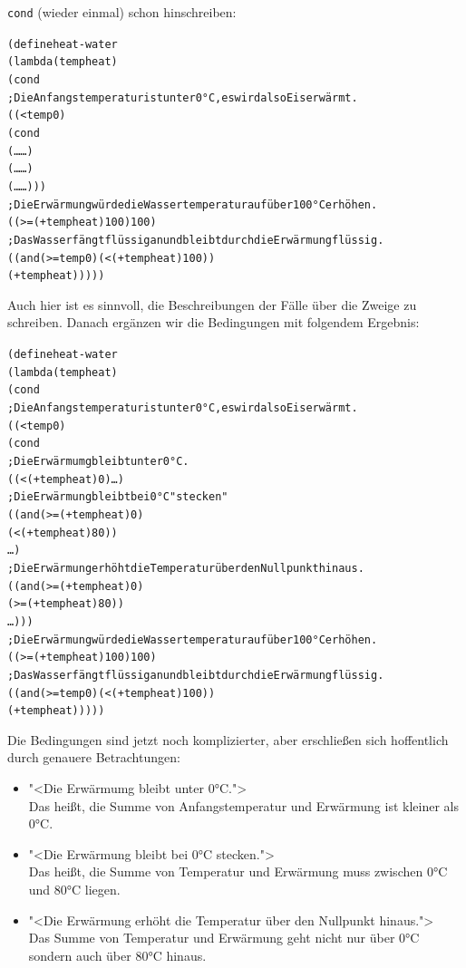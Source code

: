 \texttt{cond} (wieder einmal) schon hinschreiben:
%
\begin{alltt}
(define heat-water
  (lambda (temp heat)
    (cond
      ; Die Anfangstemperatur ist unter 0°C, es wird also Eis erwärmt.
      ((< temp 0)
       (cond
         (\ldots{} \ldots)
         (\ldots{} \ldots)
         (\ldots{} \ldots)))
      ; Die Erwärmung würde die Wassertemperatur auf über 100°C erhöhen.
      ((>= (+ temp heat) 100) 100)
      ; Das Wasser fängt flüssig an und bleibt durch die Erwärmung flüssig.
      ((and (>= temp 0) (< (+ temp heat) 100))
       (+ temp heat)))))
\end{alltt}
%
Auch hier ist es sinnvoll, die Beschreibungen der Fälle über die
Zweige zu schreiben.  Danach ergänzen wir die Bedingungen mit
folgendem Ergebnis:
%
\begin{alltt}
(define heat-water
  (lambda (temp heat)
    (cond
      ; Die Anfangstemperatur ist unter 0°C, es wird also Eis erwärmt.
      ((< temp 0)
       (cond
         ; Die Erwärmumg bleibt unter 0°C.
         ((< (+ temp heat) 0) \ldots)
         ; Die Erwärmung bleibt bei  0°C "stecken"
         ((and (>= (+ temp heat) 0)
               (< (+ temp heat) 80))
          \ldots)
         ; Die Erwärmung erhöht die Temperatur über den Nullpunkt hinaus.
         ((and (>= (+ temp heat) 0)
               (>= (+ temp heat) 80))
          \ldots)))
      ; Die Erwärmung würde die Wassertemperatur auf über 100°C erhöhen.
      ((>= (+ temp heat) 100) 100)
      ; Das Wasser fängt flüssig an und bleibt durch die Erwärmung flüssig.
      ((and (>= temp 0) (< (+ temp heat) 100))
       (+ temp heat)))))
\end{alltt}
%
Die Bedingungen sind jetzt noch komplizierter, aber erschließen sich
hoffentlich durch genauere Betrachtungen:
%
\begin{itemize}
\item "<Die Erwärmumg bleibt unter 0°C.">\\
  Das heißt, die Summe von
  Anfangstemperatur und Erwärmung ist kleiner als 0°C.
\item "<Die Erwärmung bleibt bei  0°C stecken.">\\
  Das heißt, die Summe von Temperatur und Erwärmung muss zwischen 0°C
  und 80°C liegen.
\item "<Die Erwärmung erhöht die Temperatur über den Nullpunkt hinaus.">\\
  Das Summe von Temperatur und Erwärmung geht nicht nur über 0°C
  sondern auch über 80°C hinaus.
\end{itemize}
